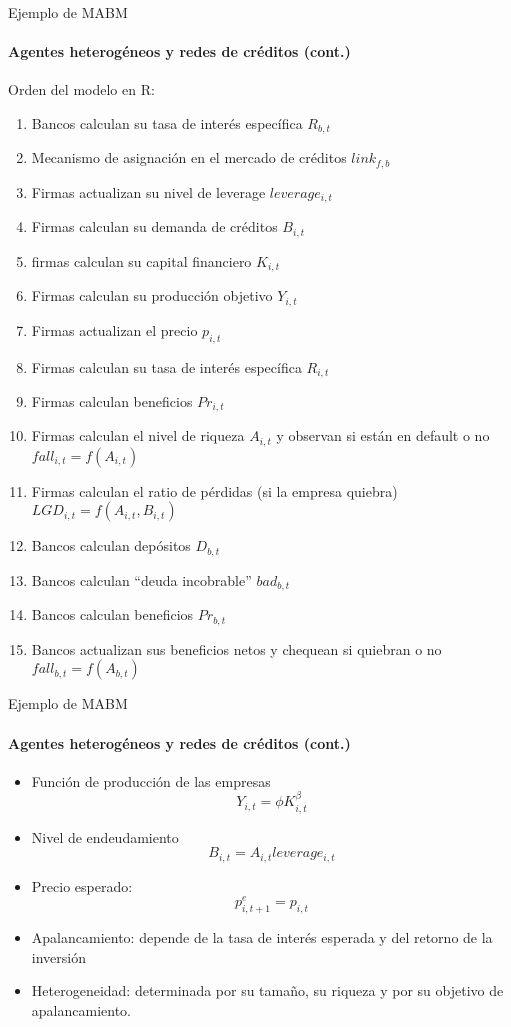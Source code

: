 \documentclass[11pt]{beamer}
\begin{document}
\begin{frame}{Ejemplo de MABM}
\framesubtitle{Agentes heterogéneos y redes de créditos (cont.)}
Orden del modelo en R:
\begin{multicols*}{2}
\begin{enumerate}
\scriptsize
    \item Bancos calculan su tasa de interés específica $R_{b,t}$
    \item Mecanismo de asignación en el mercado de créditos $link_{f,b}$
    \item Firmas actualizan su nivel de leverage $leverage_{i,t}$
    \item Firmas calculan su demanda de créditos $B_{i,t}$
    \item firmas calculan su capital financiero $K_{i,t}$
    \item Firmas calculan su producción objetivo $Y_{i,t}$
    \item Firmas actualizan el precio $p_{i,t}$
    \item Firmas calculan su tasa de interés específica $R_{i,t}$
    \item Firmas calculan beneficios $Pr_{i,t}$
    \item Firmas calculan el nivel de riqueza $A_{i,t}$ y observan si están en default o no $fall_{i,t}=f(A_{i,t})$
    \item Firmas calculan el ratio de pérdidas (si la empresa quiebra) $LGD_{i,t}=f(A_{i,t},B_{i,t})$ 
    \item Bancos calculan depósitos $D_{b,t}$
    \item Bancos calculan ``deuda incobrable'' $bad_{b,t}$
    \item Bancos calculan beneficios $Pr_{b,t}$
    \item Bancos actualizan sus beneficios netos y chequean si quiebran o no $fall_{b,t}=f(A_{b,t})$
\end{enumerate}
\end{multicols*}
\end{frame}


\begin{frame}{Ejemplo de MABM}
\framesubtitle{Agentes heterogéneos y redes de créditos (cont.)}
\begin{itemize}
    \item Función de producción de las empresas
\begin{equation*}
    Y_{i,t}=\phi K^{\beta}_{i,t}
\end{equation*}
\item Nivel de endeudamiento
\begin{equation*}
    B_{i,t}=A_{i,t} leverage_{i,t}
\end{equation*}
\item Precio esperado:
\begin{equation*}
    p^{e}_{i,t+1}=p_{i,t}
\end{equation*}
\item Apalancamiento: depende de la tasa de interés esperada y del retorno de la inversión
\item Heterogeneidad: determinada por su tamaño, su riqueza y por su objetivo de apalancamiento.
\end{itemize}
\end{frame}
\end{document}
